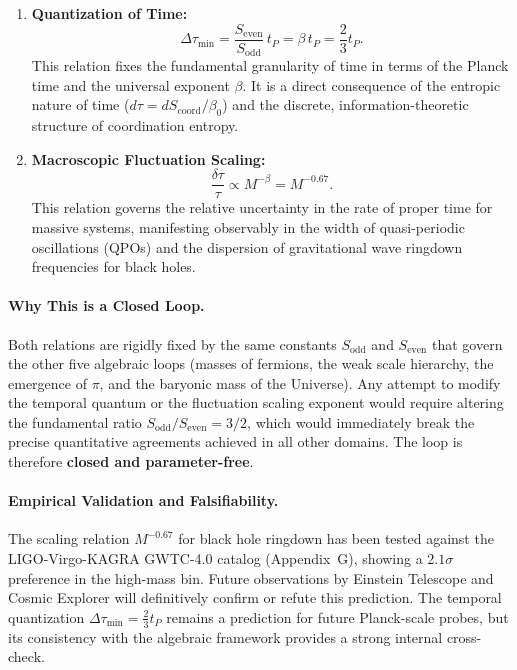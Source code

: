\documentclass[12pt,a4paper]{article}
\begin{document}
	\begin{enumerate}
		\item \textbf{Quantization of Time:} 
		\begin{equation}
			\Delta \tau_{\min} = \frac{S_{\mathrm{even}}}{S_{\mathrm{odd}}} \, t_P = \beta \, t_P = \frac{2}{3} t_P.
			\label{eq:loop6-quantization}
		\end{equation}
		This relation fixes the fundamental granularity of time in terms of the Planck time and the universal exponent \(\beta\). It is a direct consequence of the entropic nature of time (\(d\tau = dS_{\mathrm{coord}} / \beta_0\)) and the discrete, information-theoretic structure of coordination entropy.
		
		\item \textbf{Macroscopic Fluctuation Scaling:}
		\begin{equation}
			\frac{\delta \tau}{\tau} \propto M^{-\beta} = M^{-0.67}.
			\label{eq:loop6-fluctuation}
		\end{equation}
		This relation governs the relative uncertainty in the rate of proper time for massive systems, manifesting observably in the width of quasi-periodic oscillations (QPOs) and the dispersion of gravitational wave ringdown frequencies for black holes.
	\end{enumerate}
	
	\paragraph{Why This is a Closed Loop.}
	Both relations are rigidly fixed by the same constants \(S_{\mathrm{odd}}\) and \(S_{\mathrm{even}}\) that govern the other five algebraic loops (masses of fermions, the weak scale hierarchy, the emergence of \(\pi\), and the baryonic mass of the Universe). Any attempt to modify the temporal quantum or the fluctuation scaling exponent would require altering the fundamental ratio \(S_{\mathrm{odd}}/S_{\mathrm{even}} = 3/2\), which would immediately break the precise quantitative agreements achieved in all other domains. The loop is therefore \textbf{closed and parameter-free}.
	
	\paragraph{Empirical Validation and Falsifiability.}
	The scaling relation \(M^{-0.67}\) for black hole ringdown has been tested against the LIGO-Virgo-KAGRA GWTC-4.0 catalog (Appendix~G), showing a \(2.1\sigma\) preference in the high-mass bin. Future observations by Einstein Telescope and Cosmic Explorer will definitively confirm or refute this prediction. The temporal quantization \(\Delta \tau_{\min} = \frac{2}{3} t_P\) remains a prediction for future Planck-scale probes, but its consistency with the algebraic framework provides a strong internal cross-check.
	
\end{document}
